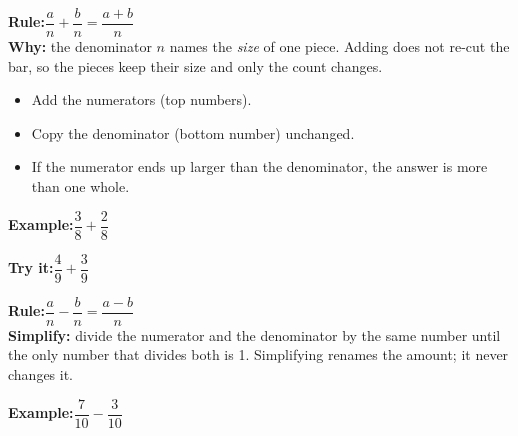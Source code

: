 \documentclass[12pt]{article}
\begin{document}


\begin{formulabox}
\textbf{Rule:}\quad $\dfrac{a}{n} + \dfrac{b}{n} = \dfrac{a+b}{n}$\\[3pt]
\textbf{Why:} the denominator $n$ names the \emph{size} of one piece. Adding does not
re-cut the bar, so the pieces keep their size and only the count changes.
\begin{itemize}[leftmargin=0.8cm, itemsep=0pt, topsep=2pt]
  \item Add the numerators (top numbers).
  \item Copy the denominator (bottom number) unchanged.
  \item If the numerator ends up larger than the denominator, the answer is more than one whole.
\end{itemize}
\end{formulabox}

\begin{examplebox}
\textbf{Example:}\quad $\dfrac{3}{8} + \dfrac{2}{8}$
\end{examplebox}

\begin{tryitbox}
\textbf{Try it:}\quad $\dfrac{4}{9} + \dfrac{3}{9}$\\[2pt]
\end{tryitbox}


\begin{formulabox}
\textbf{Rule:}\quad $\dfrac{a}{n} - \dfrac{b}{n} = \dfrac{a-b}{n}$\\[3pt]
\textbf{Simplify:} divide the numerator and the denominator by the same number until
the only number that divides both is 1. Simplifying renames the amount; it never changes it.
\end{formulabox}

\begin{examplebox}
\textbf{Example:}\quad $\dfrac{7}{10} - \dfrac{3}{10}$
\end{examplebox}
\end{document}
